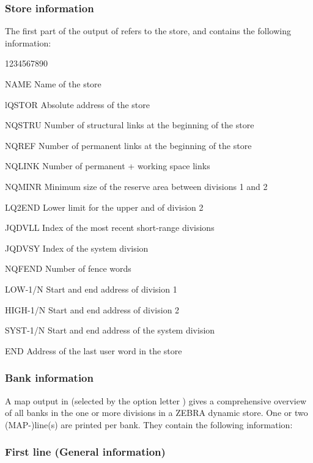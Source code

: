 \subsubsection{Store information}

The first part of the output of  refers to the store,
and contains the following information:
\begin{DLttc}{1234567890}
\item[NAME]Name of the store
\item[lQSTOR]Absolute address  of the store
\item[NQSTRU]Number of structural links at the beginning of the store
\item[NQREF]Number of permanent links at the beginning of the store
\item[NQLINK]Number of permanent + working space links
\item[NQMINR]Minimum size of the reserve area between divisions 1 and 2
\item[LQ2END]Lower limit for the upper and of division 2
\item[JQDVLL]Index of the most recent short-range divisions
\item[JQDVSY]Index of the system division
\item[NQFEND]Number of fence words
\item[LOW-1/N]Start and end address of division 1
\item[HIGH-1/N]Start and end address of division 2
\item[SYST-1/N]Start and end address of the system division
\item[END]Address of the last user word in the store
\end{DLttc}

\subsubsection{Bank information}

A map output in  (selected by the option letter )
gives a comprehensive overview of all banks in
the one or more divisions in a ZEBRA dynamic store.
One or two (MAP-)line(s) are printed per bank.
They contain the following information:

\subsubsection*{First line (General information)}

